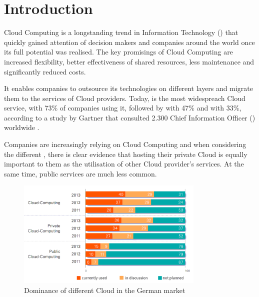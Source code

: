 
\chapter{Introduction}
Cloud Computing is a longstanding trend in Information Technology () that quickly gained attention of decision makers and companies around the world once its full potential was realised. The key promisings of Cloud Computing are increased flexibility, better effectiveness of shared resources, less maintenance and significantly reduced costs.

It enables companies to outsource its technologies on different layers and migrate them to the services of Cloud providers. Today,  is the most widespreach Cloud service, with 73\% of companies using it, followed by  with 47\% and  with 33\%, according to a study by Gartner that consulted 2.300 Chief Information Officer () worldwide \cite{website:gartner-cio-survey}.

Companies are increasingly relying on Cloud Computing and when considering the different , there is clear evidence that hosting their private Cloud is equally important to them as the utilisation of other Cloud provider's services. At the same time, public services are much less common.

\begin{figure}[H] %
	\centering
		\includegraphics[width=0.8\textwidth]{images/cloud_usage_germany.png}
	\caption{Dominance of different Cloud  in the German market \cite{kpmg2014cloud}}
\end{figure}

